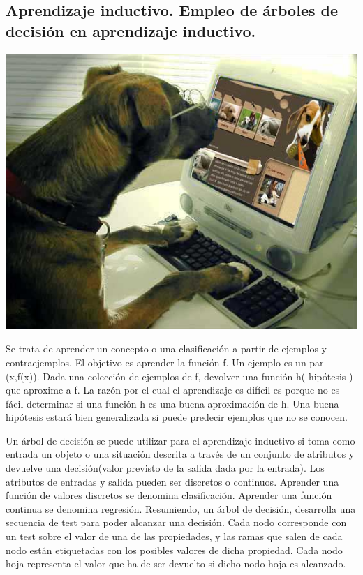 \documentclass[a4paper, 11pt]{article}
\begin{document}
\subsection{Aprendizaje inductivo. Empleo de árboles de decisión en aprendizaje inductivo.}
\includegraphics[width=\textwidth]{perrete.jpg} 

Se trata de aprender un concepto o una clasificación a partir de ejemplos y contraejemplos. El objetivo es aprender la función f.
Un ejemplo es un par (x,f(x)).
Dada una colección de ejemplos de f, devolver una función h( hipótesis ) que aproxime a f.
La razón por el cual el aprendizaje es difícil es porque no es fácil determinar si una función h es una buena aproximación de h. Una buena hipótesis estará bien generalizada si puede predecir ejemplos que no se conocen.

Un árbol de decisión se puede utilizar para el aprendizaje inductivo si toma como entrada un objeto o una situación descrita a través de un conjunto de atributos y devuelve una decisión(valor previsto de la salida dada por la entrada).
Los atributos de entradas y salida pueden ser discretos o continuos.
Aprender una función de valores discretos se denomina clasificación.
Aprender una función continua se denomina regresión.
Resumiendo, un árbol de decisión, desarrolla una secuencia de test para poder alcanzar una decisión.
Cada nodo corresponde con un test sobre el valor de una de las propiedades, y las ramas que salen de cada nodo están etiquetadas con los posibles valores de dicha propiedad. Cada nodo hoja representa el valor que ha de ser devuelto si dicho nodo hoja es alcanzado.
\end{document}
